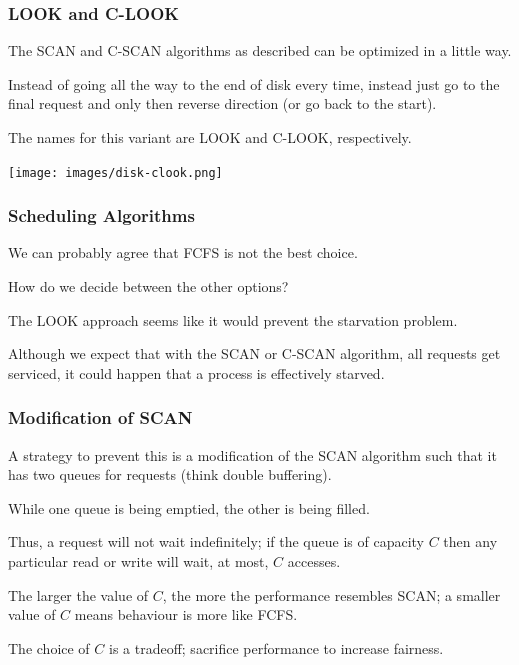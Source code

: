 \begin{frame}
\frametitle{LOOK and C-LOOK}

The SCAN and C-SCAN algorithms as described can be optimized in a little way. 

Instead of going all the way to the end of disk every time, instead just go to the final request and only then reverse direction (or go back to the start). 

The names for this variant are LOOK and C-LOOK, respectively. 

\begin{center}
	\texttt{[image: images/disk-clook.png]}
\end{center}



\end{frame}

\begin{frame}
\frametitle{Scheduling Algorithms}

We can probably agree that FCFS is not the best choice.

How do we decide between the other options?

The LOOK approach seems like it would prevent the starvation problem. 

Although we expect that with the SCAN or C-SCAN algorithm, all requests get serviced, it could happen that a process is effectively starved.

\end{frame}

\begin{frame}
\frametitle{Modification of SCAN}

A strategy to prevent this is a modification of the SCAN algorithm such that it has two queues for requests (think double buffering). 

While one queue is being emptied, the other is being filled. 

Thus, a request will not wait indefinitely; if the queue is of capacity $C$ then any particular read or write will wait, at most, $C$ accesses. 

The larger the value of $C$, the more the performance resembles SCAN; a smaller value of $C$ means behaviour is more like FCFS. 

The choice of $C$ is a tradeoff; sacrifice performance to increase fairness.


\end{frame}



